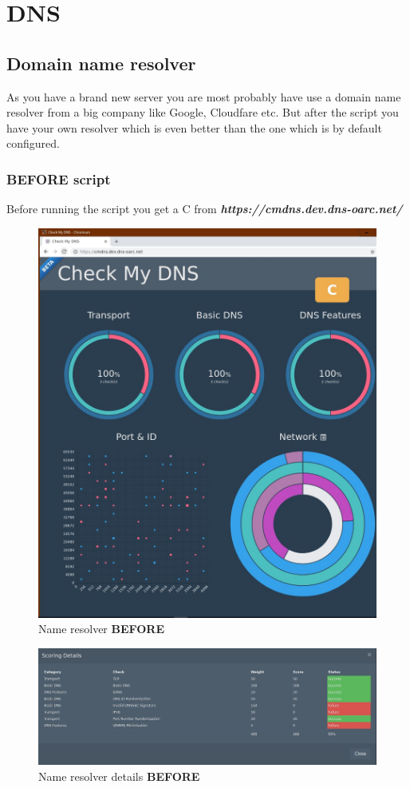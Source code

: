 

\section{DNS}
\subsection{Domain name resolver}
As you have a brand new server you are most probably have use a domain name resolver from a big company like Google, Cloudfare etc. But after the script you have your own resolver which is even better than the one which is by default configured. 
\subsubsection{BEFORE script}
Before running the script you get a C from \textbf{\textit{https://cmdns.dev.dns-oarc.net/}}

\begin{figure}[H]
	\centering
	\includegraphics[width=0.6\linewidth]{pics/score_DNS1_before}
	\caption{Name resolver \textbf{BEFORE}}
	\label{fig:scoredns1before}
\end{figure}

\begin{figure}[H]
	\centering
	\includegraphics[width=0.6\linewidth]{pics/score_DNS2_before}
		\caption{Name resolver details \textbf{BEFORE}}
	\label{fig:scoredns2before}
\end{figure}
\newpage
